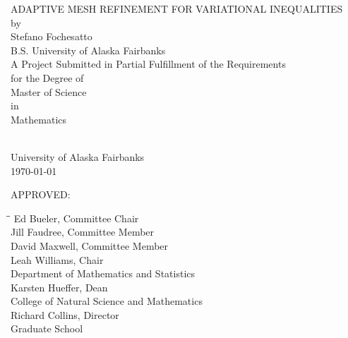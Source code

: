 \documentclass[12 pt]{report}
\begin{document}


\thispagestyle{empty}
    \begin{center}
      \uppercase{Adaptive Mesh Refinement for Variational Inequalities}\\
      \hfill \break by  \\
      Stefano Fochesatto\\
      B.S. University of Alaska Fairbanks\\
      \hfill \break
      A Project Submitted in Partial Fulfillment of the Requirements\\ 
       for the Degree of\\
      \hfill \break
      Master of Science\\
       in\\
      Mathematics\\    
      \  
         
      University of Alaska Fairbanks\\
      \monthdate\today \\
      
    \end{center}
  \hspace{6cm} APPROVED:
\begin{tabbing}
\hspace{7cm}\=\hspace{2cm}\=\kill
  \> Ed Bueler, Committee Chair \\
  \> Jill Faudree, Committee Member \\
  \> David Maxwell, Committee Member \\
  \> Leah Williams, Chair \\
  \> \> Department of Mathematics and Statistics\\
  \> Karsten Hueffer, Dean\\
  \> \> College of Natural Science and Mathematics\\
  \> Richard Collins, Director\\
  \> \> Graduate School
\end{tabbing}
  \clearpage
\end{document}
